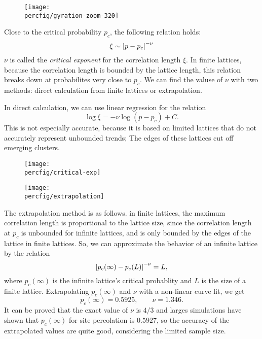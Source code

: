 \documentclass[12pt,a4paper]{article}
\newcommand{\percfig}{../fig/percolation}
\begin{document}
	\restoregeometry
	\begin{figure}
		\centering
		\texttt{[image: \\percfig/gyration-zoom-320]}
	\end{figure}
	Close to the critical probability $p_c$, the following relation holds:
	\begin{equation}
		\xi \sim \abs{p - p_c}^{-\nu}
	\end{equation}
	$\nu$ is called the \emph{critical exponent} for the correlation length $\xi$. In finite lattices, because
	the correlation length is bounded by the lattice length, this relation breaks down at probabilites very
	close to $p_c$. We can find the valuse of $\nu$ with two methods: direct calculation from finite lattices
	or extrapolation.

	In direct calculation, we can use linear regression for the relation
	\begin{equation}
		\log{\xi} = -\nu\log(p - p_c) + C.
	\end{equation}
	This is not especially accurate, because it is based on limited lattices that do not accurately represent unbounded
	trends; The edges of these lattices cut off emerging clusters.
	\begin{figure}
		\centering
		\texttt{[image: \\percfig/critical-exp]}
	\end{figure}
	\begin{figure}
		\centering
		\texttt{[image: \\percfig/extrapolation]}
	\end{figure}

	The extrapolation method is as follows. in finite lattices, the maximum correlation length is proportional to the
	lattice size, since the correlation length at $p_c$ is unbounded for infinite lattices, and is only bounded by the
	edges of the lattice in finite lattices. So, we can approximate the behavior of an infinite lattice by the relation
	\begin{equation}
		\abs{p_c(\infty) - p_c(L)}^{-\nu} = L,
	\end{equation}
	where $p_c(\infty)$ is the infinite lattice's critical probablity and $L$ is the size of a finite lattice.
	Extrapolating $p_c(\infty)$ and $\nu$ with a non-linear curve fit, we get
	\begin{equation}
		p_c(\infty) = 0.5925 ,\qquad \nu = 1.346.
	\end{equation}
	It can be proved that the exact value of $\nu$ is $4/3$ and larges simulations have shown that $p_c(\infty)$ for
	site percolation is $0.5927$, so the accuracy of the extrapolated values are quite good, considering the limited
	sample size.
	
\end{document}
